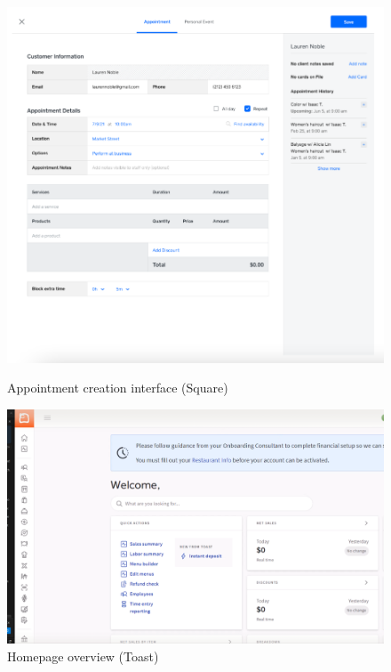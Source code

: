 \documentclass[]{VUMIFTemplateClass}
\begin{document}
\begin{figure}[h]
    \centering
    \begin{minipage}{0.48\textwidth}
        \centering
        \includegraphics[width=\textwidth]{images/examples/appointment_creating_square.png}
        \caption{Appointment creation interface (Square)}
    \end{minipage}
    \hfill
    \begin{minipage}{0.48\textwidth}
        \centering
        \includegraphics[width=\textwidth]{images/examples/homapage_toast.png}
        \caption{Homepage overview (Toast)}
    \end{minipage}
\end{figure}
\end{document}
